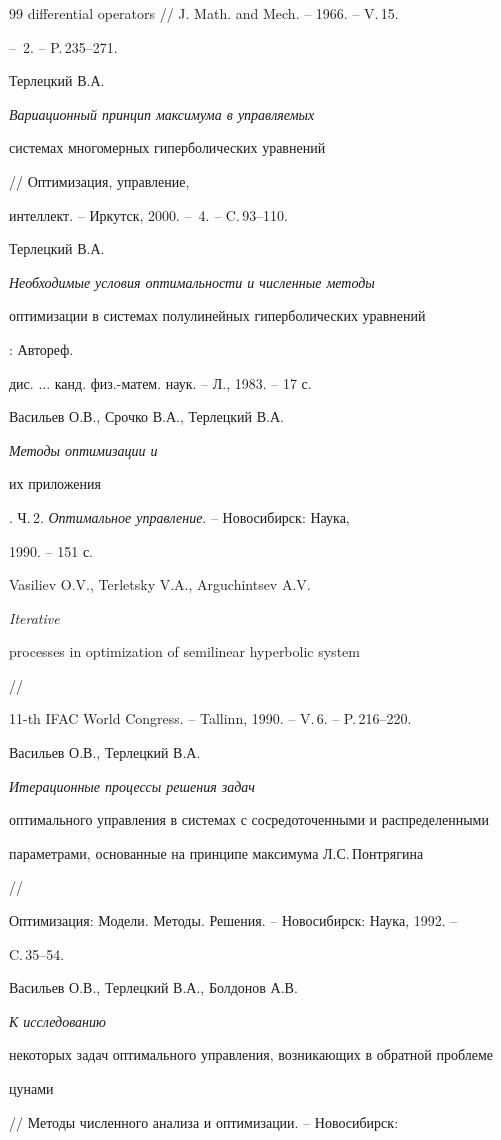 \begin{thebibliography}{99}
{differential operators} // J. Math. and Mech. -- 1966. -- V.\,15.


-- \No\,2. -- P.\,235--271.




Терлецкий В.А. {\it Вариационный принцип максимума в управляемых


системах многомерных гиперболических уравнений} // Оптимизация, управление,


интеллект. -- Иркутск, 2000. -- \No\,4. -- C.\,93--110.




Терлецкий В.А. {\it Необходимые условия оптимальности и численные методы


оптимизации в системах полулинейных гиперболических уравнений}: Автореф.


дис. $\dotsc$ канд. физ.-матем. наук. -- Л., 1983. -- 17 с.




Васильев О.В., Срочко В.А., Терлецкий В.А. {\it Методы оптимизации и


их приложения}. Ч.\,2. {\it Оптимальное управление}. -- Новосибирск: Наука,


1990. -- 151 с.




Vasiliev O.V., Terletsky V.A., Arguchintsev A.V. {\it Iterative


processes in optimization of semilinear hyperbolic system} //


11-th IFAC World Congress. -- Tallinn, 1990. -- V.\,6. -- P.\,216--220.




Васильев О.В., Терлецкий В.А. {\it Итерационные процессы решения задач


оптимального управления в системах с сосредоточенными и распределенными


параметрами, основанные на принципе максимума Л.С.\,Понтрягина} //


Оптимизация: Модели. Методы. Решения. -- Новосибирск: Наука, 1992. --


C.\,35--54.




Васильев О.В., Терлецкий В.А., Болдонов А.В. {\it К исследованию


некоторых задач оптимального управления, возникающих в обратной проблеме


цунами} // Методы численного анализа и оптимизации. -- Новосибирск:



\end{thebibliography}
